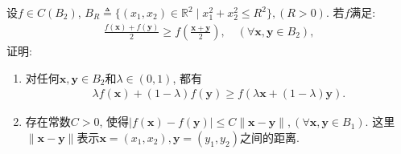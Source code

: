 \documentclass[../../main.tex]{subfiles}%
\begin{document}
\begin{example}
设$f \in C(B_2)$, $B_R \triangleq \{(x_1,x_2) \in \mathbb{R}^2 \mid x_1^2 + x_2^2 \leqslant R^2\}, (R > 0)$. 若$f$满足:
\begin{align*}
\frac{f(\mathbf{x}) + f(\mathbf{y})}{2} \geqslant f\left( \frac{\mathbf{x} + \mathbf{y}}{2} \right), \quad (\forall \mathbf{x}, \mathbf{y} \in B_2),
\end{align*}
证明:
\begin{enumerate}[(1)]
\item 对任何$\mathbf{x}, \mathbf{y} \in B_2$和$\lambda \in (0,1)$, 都有
\begin{align*}
\lambda f(\mathbf{x}) + (1 - \lambda) f(\mathbf{y}) \geqslant f(\lambda \mathbf{x} + (1 - \lambda) \mathbf{y}).
\end{align*}
\item 存在常数$C > 0$, 使得$|f(\mathbf{x}) - f(\mathbf{y})| \leqslant C \|\mathbf{x} - \mathbf{y}\|, (\forall \mathbf{x}, \mathbf{y} \in B_1)$. 这里$\|\mathbf{x} - \mathbf{y}\|$表示$\mathbf{x} = (x_1,x_2), \mathbf{y} = (y_1,y_2)$之间的距离.
\end{enumerate}
\end{example}
\end{document}
